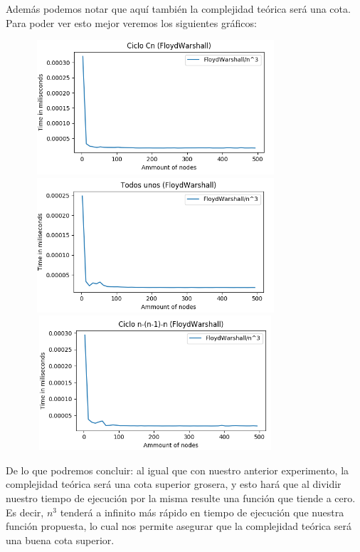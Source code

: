 \documentclass[11pt,a4paper]{article}
\begin{document}
Adem\'as podemos notar que aqu\'i tambi\'en la complejidad te\'orica ser\'a una cota. Para poder ver esto mejor veremos los siguientes gr\'aficos:

 \begin{figure}[h]
     \includegraphics[height = 5cm,width = 9cm]{F-W3cn.png}
     \includegraphics[height = 5cm,width = 9cm]{F-W3unos.png}
     \includegraphics[height = 5cm,width = 9cm]{FW3-nnl1n.png}
 \end{figure}
 \pagebreak
 
 De lo que podremos concluir: al igual que con nuestro anterior experimento, la complejidad te\'orica ser\'a una cota superior grosera, y esto har\'a que al dividir nuestro tiempo de ejecuci\'on por la misma resulte una funci\'on que tiende a cero. Es decir, $n^{3}$ tender\'a a infinito m\'as r\'apido en tiempo de ejecuci\'on que nuestra funci\'on propuesta, lo cual nos permite asegurar que la complejidad te\'orica ser\'a una buena cota superior.

\end{document}

